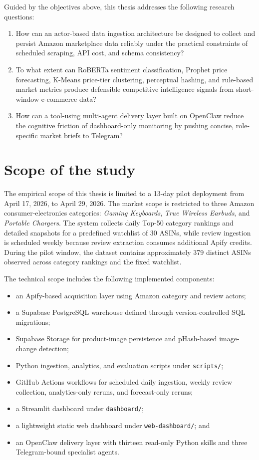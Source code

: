 Guided by the objectives above, this thesis addresses the following
research questions:
\begin{enumerate}
    \item How can an actor-based data ingestion architecture be designed
    to collect and persist Amazon marketplace data reliably under the
    practical constraints of scheduled scraping, API cost, and schema
    consistency?

    \item To what extent can RoBERTa sentiment classification, Prophet
    price forecasting, K-Means price-tier clustering, perceptual hashing,
    and rule-based market metrics produce defensible competitive
    intelligence signals from short-window e-commerce data?

    \item How can a tool-using multi-agent delivery layer built on
    OpenClaw reduce the cognitive friction of dashboard-only monitoring
    by pushing concise, role-specific market briefs to Telegram?
\end{enumerate}

\section{Scope of the study}

The empirical scope of this thesis is limited to a 13-day pilot
deployment from April 17, 2026, to April 29, 2026. The market scope is
restricted to three Amazon consumer-electronics categories:
\textit{Gaming Keyboards}, \textit{True Wireless Earbuds}, and
\textit{Portable Chargers}. The system collects daily Top-50 category
rankings and detailed snapshots for a predefined watchlist of 30 ASINs,
while review ingestion is scheduled weekly because review extraction
consumes additional Apify credits. During the pilot window, the dataset
contains approximately 379 distinct ASINs observed across category
rankings and the fixed watchlist.

The technical scope includes the following implemented components:
\begin{itemize}
    \item an Apify-based acquisition layer using Amazon category and
    review actors;
    \item a Supabase PostgreSQL warehouse defined through
    version-controlled SQL migrations;
    \item Supabase Storage for product-image persistence and
    pHash-based image-change detection;
    \item Python ingestion, analytics, and evaluation scripts under
    \texttt{scripts/};
    \item GitHub Actions workflows for scheduled daily ingestion,
    weekly review collection, analytics-only reruns, and forecast-only
    reruns;
    \item a Streamlit dashboard under \texttt{dashboard/};
    \item a lightweight static web dashboard under
    \texttt{web-dashboard/}; and
    \item an OpenClaw delivery layer with thirteen read-only Python
    skills and three Telegram-bound specialist agents.
\end{itemize}

